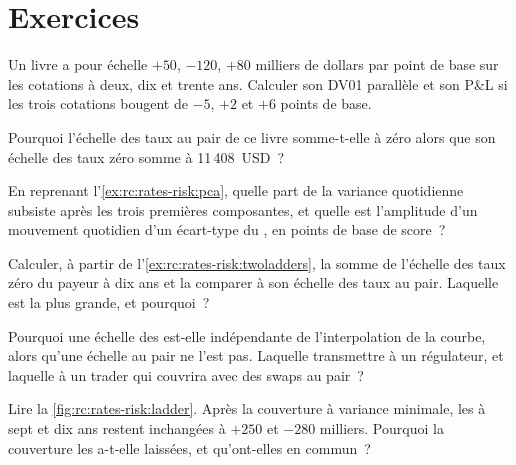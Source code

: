\section{Exercices}

\begin{exercise}[$\star$]\label{exo:rc:rates-risk:1}
Un livre a pour échelle $+50$, $-120$, $+80$ milliers de dollars par point de base
sur les cotations à deux, dix et trente ans. Calculer son DV01 parallèle et son
P\&L si les trois cotations bougent de $-5$, $+2$ et $+6$ points de base.
\end{exercise}

\begin{exercise}[$\star$]\label{exo:rc:rates-risk:2}
Pourquoi l'échelle des taux au pair de ce livre somme-t-elle à zéro alors que son échelle des taux zéro somme à
11\,408~USD~?
\end{exercise}

\begin{exercise}[$\star$]\label{exo:rc:rates-risk:3}
En reprenant l'\cref{ex:rc:rates-risk:pca}, quelle part de la variance quotidienne subsiste après
les trois premières composantes, et quelle est l'amplitude d'un mouvement
quotidien d'un écart-type du , en points de base de score~?
\end{exercise}

\begin{exercise}[$\star\star$]\label{exo:rc:rates-risk:4}
Calculer, à partir de l'\cref{ex:rc:rates-risk:twoladders}, la somme de l'échelle des taux zéro du payeur à dix ans
et la comparer à son échelle des taux au pair. Laquelle est la plus grande, et pourquoi~?
\end{exercise}

\begin{exercise}[$\star\star$]\label{exo:rc:rates-risk:5}
Pourquoi une échelle des  est-elle indépendante de l'interpolation de la courbe,
alors qu'une échelle au pair ne l'est pas. Laquelle transmettre à un
régulateur, et laquelle à un trader qui couvrira avec des swaps au pair~?
\end{exercise}

\begin{exercise}[$\star\star$]\label{exo:rc:rates-risk:6}
Lire la \cref{fig:rc:rates-risk:ladder}. Après la couverture à variance minimale, les
 à sept et dix ans restent inchangées à $+250$ et $-280$ milliers. Pourquoi
la couverture les a-t-elle laissées, et qu'ont-elles en commun~?
\end{exercise}


